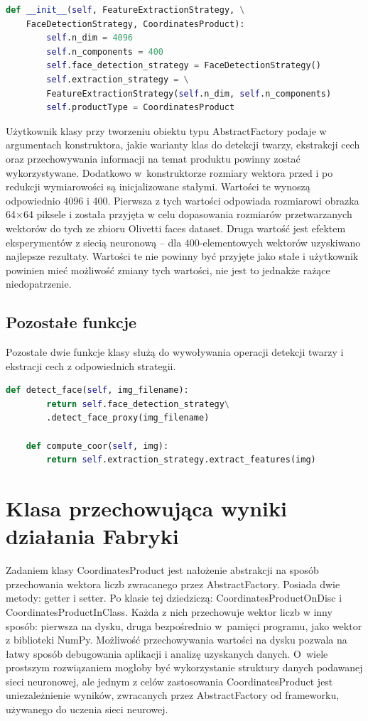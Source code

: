 \documentclass[oneside, eng]{mgr}
\begin{document}
\begin{lstlisting}[language=Python]
    def __init__(self, FeatureExtractionStrategy, \
    FaceDetectionStrategy, CoordinatesProduct):
        self.n_dim = 4096
        self.n_components = 400
        self.face_detection_strategy = FaceDetectionStrategy()
        self.extraction_strategy = \
        FeatureExtractionStrategy(self.n_dim, self.n_components)
        self.productType = CoordinatesProduct
\end{lstlisting}

Użytkownik klasy przy tworzeniu obiektu typu AbstractFactory podaje w argumentach konstruktora, jakie warianty klas do detekcji twarzy, ekstrakcji cech oraz przechowywania informacji na temat produktu powinny zostać wykorzystywane. Dodatkowo w~konstruktorze rozmiary wektora przed i po redukcji wymiarowości są inicjalizowane stałymi. Wartości te wynoszą odpowiednio 4096 i 400. Pierwsza z tych wartości odpowiada rozmiarowi obrazka 64$\times$64 piksele i została przyjęta w celu dopasowania rozmiarów przetwarzanych wektorów do tych ze zbioru Olivetti faces dataset. Druga wartość jest efektem eksperymentów z siecią neuronową -- dla 400-elementowych wektorów uzyskiwano najlepsze rezultaty. Wartości te nie powinny być przyjęte jako stałe i użytkownik powinien mieć możliwość zmiany tych wartości, nie jest to jednakże rażące niedopatrzenie.

\subsection{Pozostałe funkcje}

Pozostałe dwie funkcje klasy służą do wywoływania operacji detekcji twarzy i ekstracji cech z odpowiednich strategii.

\begin{lstlisting}[language=Python]
    def detect_face(self, img_filename):
        return self.face_detection_strategy\
        .detect_face_proxy(img_filename)

    def compute_coor(self, img):
        return self.extraction_strategy.extract_features(img)
\end{lstlisting}



\section{Klasa przechowująca wyniki działania Fabryki}

Zadaniem klasy CoordinatesProduct jest nałożenie abstrakcji na sposób przechowania wektora liczb zwracanego przez AbstractFactory. Posiada dwie metody: getter i setter. Po klasie tej dziedziczą: CoordinatesProductOnDisc i CoordinatesProductInClass. Każda z nich przechowuje wektor liczb w inny sposób: pierwsza na dysku, druga bezpośrednio w~pamięci programu, jako wektor z biblioteki NumPy. Możliwość przechowywania wartości na dysku pozwala na łatwy sposób debugowania aplikacji i analizę uzyskanych danych. O~wiele prostszym rozwiązaniem mogłoby być wykorzystanie struktury danych podawanej sieci neuronowej, ale jednym z celów zastosowania CoordinatesProduct jest uniezależnienie wyników, zwracanych przez AbstractFactory od frameworku, używanego do uczenia sieci neurowej.
\end{document}
